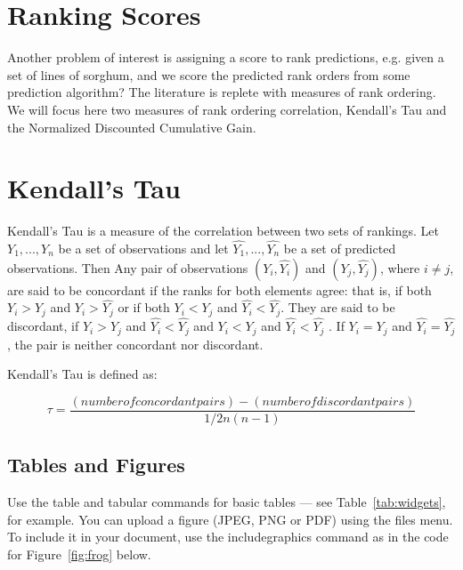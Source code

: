 \section{Ranking Scores}
Another problem of interest is assigning a score to rank predictions, e.g. given a set of lines of sorghum, and we score the predicted rank orders from some prediction algorithm? The literature is replete with measures of rank ordering. We will focus here two measures of rank ordering correlation, Kendall's Tau and the Normalized Discounted Cumulative Gain. 


\section{Kendall's Tau}

Kendall's Tau is a measure of the correlation between two sets of rankings. Let $Y_1, ..., Y_n$  be a set of observations and let $\hat{Y_1}, ..., \hat{Y_n}$ be a set of predicted observations. Then Any pair of observations $(Y_i, \hat{Y_i})$ and $(Y_j, \hat{Y_j})$, where $i \not= j$, are said to be concordant if the ranks for both elements agree: that is, if both $Y_i > Y_j$ and $\hat{Y_i} > \hat{Y_j}$ or if both $Y_i < Y_j$ and $\hat{Y_i} < \hat{Y_j}$. They are said to be discordant, if $Y_i > Y_j$ and $\hat{Y_i} < \hat{Y_j}$ and $Y_i < Y_j$ and $\hat{Y_i} < \hat{Y_j}$ . If $Y_i = Y_j$ and $\hat{Y_i} = \hat{Y_j}$, the pair is neither concordant nor discordant.

Kendall's Tau is defined as:

\begin{equation}
	\tau = \frac{(number of concordant pairs) - (number of discordant pairs)}{1/2 n(n-1)}
\end{equation}

\subsection{Tables and Figures}






Use the table and tabular commands for basic tables --- see Table~\ref{tab:widgets}, for example. You can upload a figure (JPEG, PNG or PDF) using the files menu. To include it in your document, use the includegraphics command as in the code for Figure~\ref{fig:frog} below.

